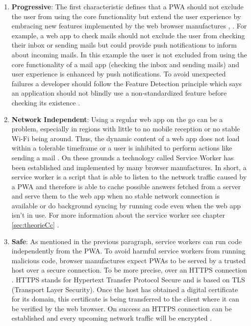 \begin{enumerate} 
	\item  \textbf{Progressive}: The first characteristic defines that a  \acs{PWA} should not exclude the user from using the core functionality but extend the user experience by embracing new features implemented by the web browser manufactures \cite[p. 100]{liebelProgressiveWebApps2019}, \cite[p. 2]{hajianProgressiveWebApps2019}. For example, a web app to check mails should not exclude the user from checking their inbox or sending mails but could provide push notifications to inform about incoming mails. In this example the user is not excluded from using the core functionality of a mail app (checking the inbox and sending mails) and user experience is enhanced by push notifications. To avoid unexpected failures a developer should follow the Feature Detection principle which says an application should not blindly use a non-standardized feature before checking its existence \cite[p. 101]{liebelProgressiveWebApps2019}.

	\item \textbf{Network Independent}: Using a regular web app on the go can be a problem, especially in regions with little to no mobile reception or no stable Wi-Fi being around. Thus, the dynamic content of a web app does not load within a tolerable timeframe or a user is inhibited to perform actions like sending a mail \cite[p. 106]{liebelProgressiveWebApps2019}. On these grounds a technology called Service Worker has been established and implemented by many browser manufactures. In short, a service worker is a script that is able to listen to the network traffic caused by a  \acs{PWA} and therefore is able to cache possible answers fetched from a server and serve them to the web app when no stable network connection is available or do background syncing by running code even when the web app isn’t in use. For more information about the service worker see chapter \ref{sec:theorieCc} \cite[p. 43]{sheppardBeginningProgressiveWeb2017}.

	\item \textbf{Safe}: As mentioned in the previous paragraph, service workers can run code independently from the  \acs{PWA}. To avoid harmful service workers from running malicious code, browser manufactures expect  \acs{PWA}s to be served by a trusted host over a secure connection. To be more precise, over an HTTPS connection \cite[p. 24]{sheppardBeginningProgressiveWeb2017}. HTTPS stands for Hypertext Transfer Protocol Secure and is based on TLS (Transport Layer Security). Once the host has obtained a digital certificate for its domain, this certificate is being transferred to the client where it can be verified by the web browser. On success an HTTPS connection can be established and every upcoming network traffic will be encrypted \cite[pp. 112-113]{liebelProgressiveWebApps2019}.


\end{enumerate}
